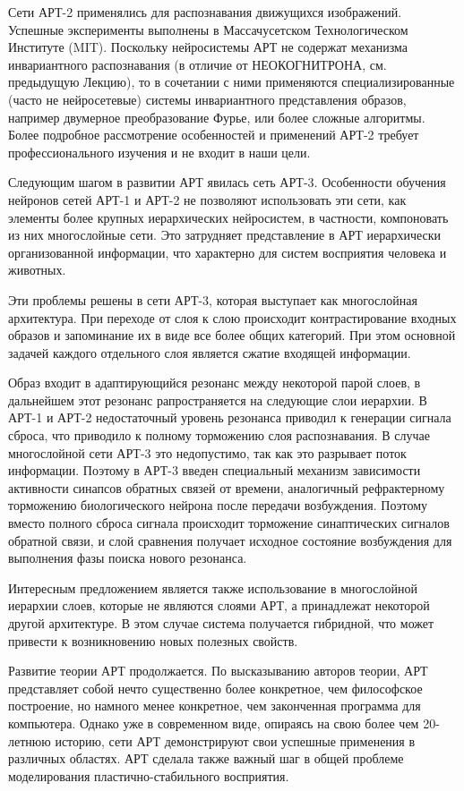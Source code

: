 \documentclass[12pt,a4paper,article]{article}
\begin{document}
Сети АРТ-2 применялись для распознавания движущихся изображений. Успешные эксперименты выполнены в Массачусетском Технологическом Институте (MIT). Поскольку нейросистемы АРТ не содержат механизма инвариантного распознавания (в отличие от НЕОКОГНИТРОНА, см. предыдущую Лекцию), то в сочетании с ними применяются специализированные (часто не нейросетевые) системы инвариантного представления образов, например двумерное преобразование Фурье, или более сложные алгоритмы. Более подробное рассмотрение особенностей и применений АРТ-2 требует профессионального изучения и не входит в наши цели.

Следующим шагом в развитии АРТ явилась сеть АРТ-3. Особенности обучения нейронов сетей АРТ-1 и АРТ-2 не позволяют использовать эти сети, как элементы более крупных иерархических нейросистем, в частности, компоновать из них многослойные сети. Это затрудняет представление в АРТ иерархически организованной информации, что характерно для систем восприятия человека и животных.

Эти проблемы решены в сети АРТ-3, которая выступает как многослойная архитектура. При переходе от слоя к слою происходит контрастирование входных образов и запоминание их в виде все более общих категорий. При этом основной задачей каждого отдельного слоя является сжатие входящей информации.

Образ входит в адаптирующийся резонанс между некоторой парой слоев, в дальнейшем этот резонанс рапространяется на следующие слои иерархии. В АРТ-1 и АРТ-2 недостаточный уровень резонанса приводил к генерации сигнала сброса, что приводило к полному торможению слоя распознавания. В случае многослойной сети АРТ-3 это недопустимо, так как это разрывает поток информации. Поэтому в АРТ-3 введен специальный механизм зависимости активности синапсов обратных связей от времени, аналогичный рефрактерному торможению биологического нейрона после передачи возбуждения. Поэтому вместо полного сброса сигнала происходит торможение синаптических сигналов обратной связи, и слой сравнения получает исходное состояние возбуждения для выполнения фазы поиска нового резонанса.

Интересным предложением является также использование в многослойной иерархии слоев, которые не являются слоями АРТ, а принадлежат некоторой другой архитектуре. В этом случае система получается гибридной, что может привести к возникновению новых полезных свойств.

Развитие теории АРТ продолжается. По высказыванию авторов теории, АРТ представляет собой нечто существенно более конкретное, чем философское построение, но намного менее конкретное, чем законченная программа для компьютера. Однако уже в современном виде, опираясь на свою более чем 20-летнюю историю, сети АРТ демонстрируют свои успешные применения в различных областях. АРТ сделала также важный шаг в общей проблеме моделирования пластично-стабильного восприятия.
\end{document}
